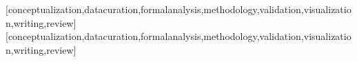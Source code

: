 \documentclass[english]{textolivre}
\begin{document}
\printbibliography\label{sec-bib}


\begin{contributors}
[conceptualization,datacuration,formalanalysis,methodology,validation,visualization,writing,review]
[conceptualization,datacuration,formalanalysis,methodology,validation,visualization,writing,review]
\end{contributors}
\end{document}
